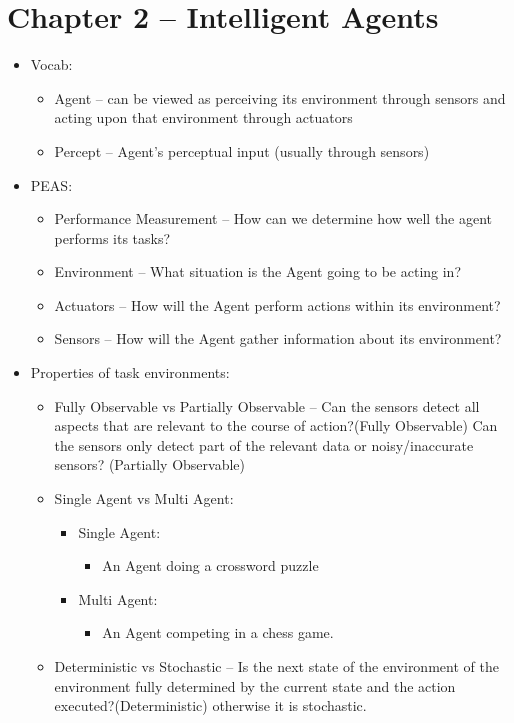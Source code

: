 \documentclass{article}
\begin{document}
\section*{Chapter 2 -- Intelligent Agents}
\begin{itemize}
	\item Vocab:
	\begin{itemize}
		\item Agent -- can be viewed as perceiving its environment through sensors and acting upon that environment through actuators
		\item Percept -- Agent's perceptual input (usually through sensors)
	\end{itemize}
	\item PEAS:
		\begin{itemize}
			\item Performance Measurement -- How can we determine how well the agent performs its tasks?
			\item Environment -- What situation is the Agent going to be acting in?
			\item Actuators -- How will the Agent perform actions within its environment?
			\item Sensors -- How will the Agent gather information about its environment?
		\end{itemize}
	\item Properties of task environments:
	\begin{itemize}
		\item Fully Observable vs Partially Observable -- Can the sensors detect all aspects that are relevant to the course of action?(Fully Observable) Can the sensors only detect part of the relevant data or noisy/inaccurate sensors? (Partially Observable)
		\item Single Agent vs Multi Agent:
		\begin{itemize}
			\item Single Agent:
			\begin{itemize}
				\item An Agent doing a crossword puzzle
			\end{itemize}
			\item Multi Agent:
			\begin{itemize}
				\item An Agent competing in a chess game.
			\end{itemize}
		\end{itemize}
		\item Deterministic vs Stochastic -- Is the next state of the environment of the environment fully determined by the current state and the action executed?(Deterministic) otherwise it is stochastic.

\end{itemize}
\end{itemize}
\end{document}
